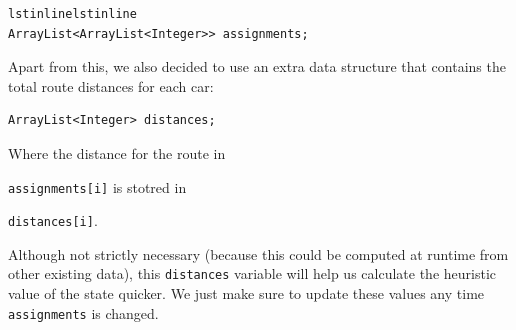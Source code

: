 \documentclass[12]{article}
\begin{document}
\begin{lstlisting}lstinlinelstinline
ArrayList<ArrayList<Integer>> assignments;
\end{lstlisting}

Apart from this, we also decided to use an extra data structure that contains the total route distances for each car:

\begin{lstlisting}
ArrayList<Integer> distances;
\end{lstlisting}

Where the distance for the route in \raggedright\lstinline{assignments[i]} is stotred in \raggedright\lstinline{distances[i]}.

Although not strictly necessary (because this could be computed at runtime from other existing data), this \lstinline{distances} variable will help us calculate the heuristic value of the state quicker. We just make sure to update these values any time \lstinline{assignments} is changed.
\end{document}

